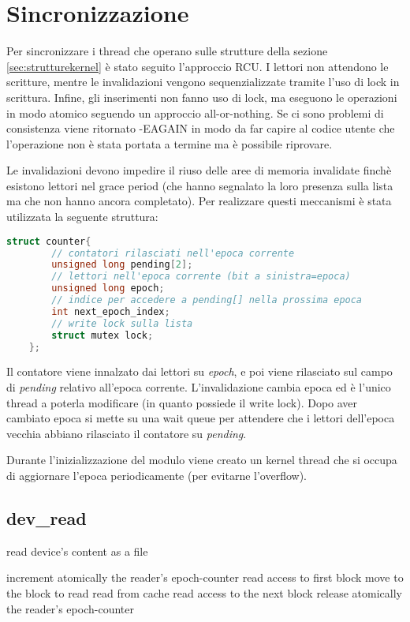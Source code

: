 \documentclass[a4paper,12pt,oneside]{book}
\begin{document}
	\section{Sincronizzazione}
	Per sincronizzare i thread che operano sulle strutture della sezione \ref{sec:strutturekernel} è stato seguito l'approccio RCU. I lettori non attendono le scritture, mentre le invalidazioni vengono sequenzializzate tramite l'uso di lock in scrittura. Infine, gli inserimenti non fanno uso di lock, ma eseguono le operazioni in modo atomico seguendo un approccio all-or-nothing. Se ci sono problemi di consistenza viene ritornato -EAGAIN in modo da far capire al codice utente che l'operazione non è stata portata a termine ma è possibile riprovare.\\

\par Le invalidazioni devono impedire il riuso delle aree di memoria invalidate finchè esistono lettori nel grace period (che hanno segnalato la loro presenza sulla lista ma che non hanno ancora completato). Per realizzare questi meccanismi è stata utilizzata la seguente struttura:
\begin{lstlisting}[language=C]
	struct counter{
		// contatori rilasciati nell'epoca corrente
		unsigned long pending[2];                  
		// lettori nell'epoca corrente (bit a sinistra=epoca)
		unsigned long epoch;                           
		// indice per accedere a pending[] nella prossima epoca
		int next_epoch_index;                         
		// write lock sulla lista
		struct mutex lock;                                 
	};
\end{lstlisting}
Il contatore viene innalzato dai lettori su \emph{epoch}, e poi viene rilasciato sul campo di \emph{pending} relativo all'epoca corrente. L'invalidazione cambia epoca ed è l'unico thread a poterla modificare (in quanto possiede il write lock). Dopo aver cambiato epoca si mette su una wait queue per attendere che i lettori dell'epoca vecchia abbiano rilasciato il contatore su \emph{pending}.

 \par Durante l'inizializzazione del modulo viene creato un kernel thread che si occupa di aggiornare l'epoca periodicamente (per evitarne l'overflow).

	\subsection{dev\_read}

\begin{algorithm}
\caption{read device's content as a file}
\begin{algorithmic}
    	\State increment atomically the reader's epoch-counter
    	\State read access to first block
		\State move to the block to read
		\State read from cache
		\State read access to the next block
	\EndWhile
	\State release atomically the reader's epoch-counter
  \EndIf
\end{algorithmic}
\end{algorithm}
\end{document}
